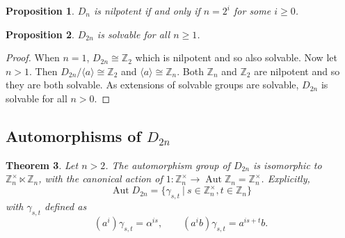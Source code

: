 \documentclass[12pt]{article}
\newtheorem{thm}{Theorem}
\newtheorem{prop}[thm]{Proposition}
\DeclareMathOperator{\Aut}{Aut }
\begin{document}
\begin{prop}\label{prop:dihedral:nilpotent}
$D_n$ is nilpotent if and only if $n=2^i$ for some $i\geq 0$.
\end{prop}

\begin{prop}\label{prop:dihedral:solvable}
$D_{2n}$ is solvable for all $n\geq 1$.
\end{prop}

\begin{proof}
When $n=1$, $D_{2n}\cong \mathbb{Z}_2$ which is nilpotent and so also solvable.
Now let $n>1$.  Then $D_{2n}/\langle a\rangle\cong \mathbb{Z}_2$ and $\langle a\rangle\cong \mathbb{Z}_n$.  Both $\mathbb{Z}_n$ and $\mathbb{Z}_2$ are nilpotent and so they are both solvable.
As extensions of solvable groups are solvable, $D_{2n}$ is solvable for all $n>0$.
\end{proof}

\subsection{Automorphisms of $D_{2n}$}

\begin{thm}
Let $n>2$.
The automorphism group of $D_{2n}$ is isomorphic to 
$\mathbb{Z}_n^\times \ltimes \mathbb{Z}_n$, with the canonical action of 
$1:\mathbb{Z}_n^\times \rightarrow \Aut \mathbb{Z}_n = \mathbb{Z}_n^\times$.
Explicitly, 
\[\Aut D_{2n}=\{\gamma_{s,t}~|~s\in \mathbb{Z}_n^\times, t\in \mathbb{Z}_n\}\]
with $\gamma_{s,t}$ defined as
\[(a^i)\gamma_{s,t}=\alpha^{is},\qquad (a^i b)\gamma_{s,t}=a^{is+t}b.\]
\end{thm}
\end{document}
